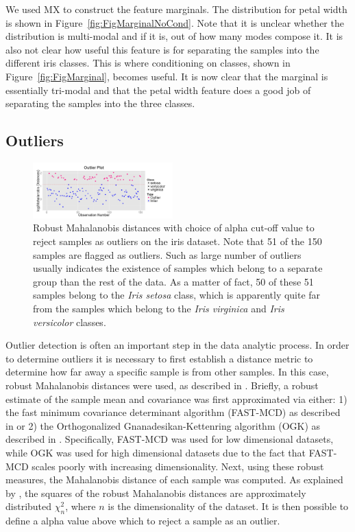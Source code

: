 \documentclass[twoside,leqno,twocolumn]{article}
\begin{document}
We used MX to construct the feature marginals. The distribution for petal width is shown in Figure~\ref{fig:FigMarginalNoCond}. Note that it is unclear whether the distribution is multi-modal and if it is, out of how many modes compose it. It is also not clear how useful this feature is for separating the samples into the different iris classes. This is where conditioning on classes, shown in Figure~\ref{fig:FigMarginal}, becomes useful. It is now clear that the marginal is essentially tri-modal and that the petal width feature does a good job of separating the samples into the three classes.

\subsection{Outliers}
\label{subsec:SubSecOutliers}

\begin{figure}[t!]
	\centering
	\includegraphics[width=0.48\textwidth]{Figures/Iris/OutliersIris.png}
	\caption{Robust Mahalanobis distances with choice of alpha cut-off value to reject samples as outliers on the iris dataset. Note that 51 of the 150 samples are flagged as outliers. Such as large number of outliers usually indicates the existence of samples which belong to a separate group than the rest of the data. As a matter of fact, 50 of these 51 samples belong to the \textit{Iris setosa} class, which is apparently quite far from the samples which belong to the \textit{Iris virginica} and \textit{Iris versicolor} classes.}
	\label{fig:FigOutliers}
\end{figure}

Outlier detection is often an important step in the data analytic process. In order to determine outliers it is necessary to first establish a distance metric to determine how far away a specific sample is from other samples. In this case, robust Mahalanobis distances were used, as described in \cite{hubert2008high}. Briefly, a robust estimate of the sample mean and covariance was first approximated via either: 1) the fast minimum covariance determinant algorithm (FAST-MCD) as described in \cite{rousseeuw1999fast} or 2) the Orthogonalized Gnanadesikan-Kettenring algorithm (OGK) as described in \cite{maronna2002robust}. Specifically, FAST-MCD was used for low dimensional datasets, while OGK was used for high dimensional datasets due to the fact that FAST-MCD scales poorly with increasing dimensionality. Next, using these robust measures, the Mahalanobis distance of each sample was computed. As explained by \cite{hardin2012distribution}, the squares of the robust Mahalanobis distances are approximately distributed $\chi^2_n$, where $n$ is the dimensionality of the dataset. It is then possible to define a alpha value above which to reject a sample as an outlier. 
\end{document}
